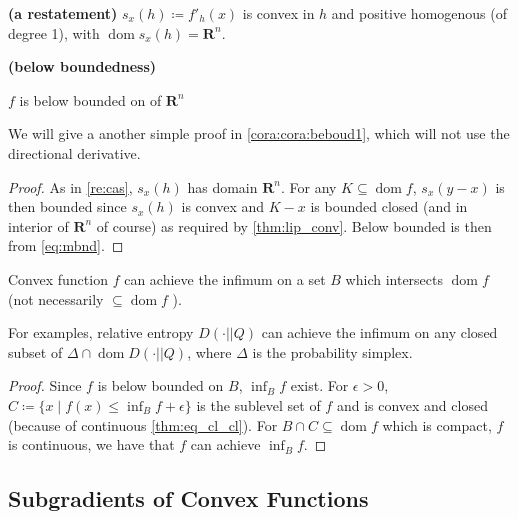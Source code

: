 \documentclass{article}
\newcommand{\bfs}[1]{\textbf{({#1}) }}
\newcommand{\dom}{\operatorname{dom}}
\begin{document}
\begin{cora}\bfs{a restatement}\label{cora:sx_conv}
$s_x(h)\coloneqq f'_h(x)$ is convex in $h$ and positive homogenous (of degree 1), with $\dom s_x(h)=\mathbf{R}^n$.
\end{cora}
\begin{cora}\bfs{below boundedness}\label{cora:beboud}

\centerline{$f$ is below bounded on  of $\mathbf{R}^{n}$}
\end{cora}
\begin{rema}
We will give a another simple proof in \cref{cora:cora:beboud1}, which will not use the directional derivative.
\end{rema}
\begin{proof}\color{ForestGreen}
As in \cref{re:cas},  $s_x(h)$ has domain $\mathbf{R}^n$. For any  $K\subseteq \dom f$,  $s_x(y-x)$ is then bounded since  $s_x(h)$ is convex and $K-x$ is bounded closed (and in interior of $\mathbf{R}^n$ of course) as required by \cref{thm:lip_conv}. Below bounded is then from \cref{eq:mbnd}.
\end{proof}
\begin{cora}
Convex function $f$ can achieve the infimum on a  set $B$ which intersects $\dom f$ (not necessarily $\subseteq \dom f$ ).
\end{cora}
\begin{rema}
For examples, relative entropy $D(\cdot||Q)$ can achieve the infimum on any closed subset of $\Delta\cap \dom D(\cdot||Q)$, where $\Delta$ is the probability simplex.
\end{rema}
\begin{proof}\color{ForestGreen}
Since $f$ is  below bounded on $B$, $\inf_B f$ exist. For $\epsilon>0$, $C\coloneqq \{x\mid f(x) \le \inf_B f+\epsilon \}$ is the sublevel set of $f$ and is convex and closed (because of continuous \cref{thm:eq_cl_cl}). For $B\cap C\subseteq \dom f $ which is compact, $f$ is continuous, we have that $f$ can achieve $\inf_B f$.
\end{proof}


\subsection{Subgradients of Convex Functions}
\end{document}
